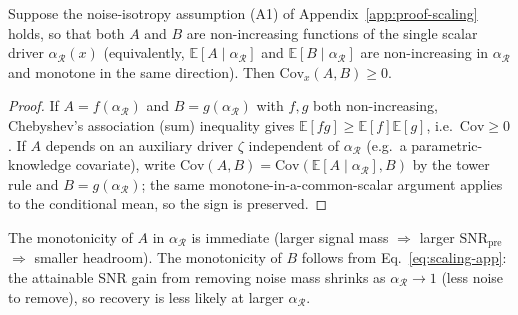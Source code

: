 \begin{lemma}
\label{lem:assoc}
Suppose the noise-isotropy assumption (A1) of
Appendix~\ref{app:proof-scaling} holds, so that both $A$ and $B$ are
non-increasing functions of the single scalar driver $\alpha_{\mathcal{R}}(x)$
(equivalently, $\mathbb{E}[A\mid\alpha_{\mathcal{R}}]$ and
$\mathbb{E}[B\mid\alpha_{\mathcal{R}}]$ are non-increasing in
$\alpha_{\mathcal{R}}$ and monotone in the same direction). Then
$\mathrm{Cov}_x(A,B)\ge0$.
\end{lemma}

\begin{proof}
If $A=f(\alpha_{\mathcal{R}})$ and $B=g(\alpha_{\mathcal{R}})$ with $f,g$ both
non-increasing, Chebyshev's association (sum) inequality gives
$\mathbb{E}[fg]\ge\mathbb{E}[f]\mathbb{E}[g]$, i.e.\ $\mathrm{Cov}\ge0$. If $A$
depends on an auxiliary driver $\zeta$ independent of $\alpha_{\mathcal{R}}$
(e.g.\ a parametric-knowledge covariate), write
$\mathrm{Cov}(A,B)=\mathrm{Cov}(\mathbb{E}[A\mid\alpha_{\mathcal{R}}],B)$ by the
tower rule and $B\!=\!g(\alpha_{\mathcal{R}})$; the same monotone-in-a-common-scalar
argument applies to the conditional mean, so the sign is preserved.
\end{proof}

The monotonicity of $A$ in $\alpha_{\mathcal{R}}$ is immediate (larger signal
mass $\Rightarrow$ larger $\mathrm{SNR}_{\mathrm{pre}}$ $\Rightarrow$ smaller
headroom). The monotonicity of $B$ follows from Eq.~\eqref{eq:scaling-app}:
the attainable SNR gain from removing noise mass shrinks as
$\alpha_{\mathcal{R}}\to1$ (less noise to remove), so recovery is less likely
at larger $\alpha_{\mathcal{R}}$.

